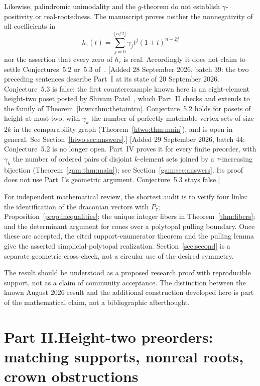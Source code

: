 \documentclass[11pt]{article}
\numberwithin{equation}{section}
\theoremstyle{definition}
\begin{document}
Likewise, palindromic unimodality and the $g$-theorem do not establish
$\gamma$-positivity or real-rootedness. The manuscript proves neither the
nonnegativity of all coefficients in
\[
 h_\tau(t)=\sum_{j=0}^{\lfloor n/2\rfloor}
       \gamma_jt^j(1+t)^{n-2j}
\]
nor the assertion that every zero of $h_\tau$ is real. Accordingly it does
not claim to settle Conjectures~5.2 or~5.3 of~\cite{AC}.
[Added 28 September 2026, batch 39: the two preceding sentences describe
Part~I at its state of 20 September 2026. Conjecture~5.3 is false: the first
counterexample known here is an eight-element height-two poset posted by
Shivam Patel~\cite{Patel}, which Part~II checks and extends to the family of
Theorem~\ref{htwo:thm:thetaintro}. Conjecture~5.2 holds for posets of height at
most two, with $\gamma_k$ the number of perfectly matchable vertex sets of
size $2k$ in the comparability graph (Theorem~\ref{htwo:thm:main}), and is
open in general. See Section~\ref{htwo:sec:answers}.]
[Added 29 September 2026, batch 44: Conjecture~5.2 is no longer open. Part~IV
proves it for every finite preorder, with $\gamma_k$ the number of ordered
pairs of disjoint $k$-element sets joined by a $\tau$-increasing bijection
(Theorem~\ref{gam:thm:main}); see Section~\ref{gam:sec:answers}. Its proof
does not use Part~I's geometric argument. Conjecture~5.3 stays false.]

For independent mathematical review, the shortest audit is to verify four
links: the identification of the draconian vectors with $P_\tau$;
Proposition~\ref{prop:inequalities}; the unique integer fibers in
Theorem~\ref{thm:fibers}; and the determinant argument for cones over a
polytopal pulling boundary. Once these are accepted, the cited
support-enumerator theorem and the pulling lemma give the asserted
simplicial-polytopal realization. Section~\ref{sec:second} is a separate
geometric cross-check, not a circular use of the desired symmetry.

The result should be understood as a proposed research proof with reproducible
support, not as a claim of community acceptance. The distinction between the
known August 2026 result and the additional construction developed here is
part of the mathematical claim, not a bibliographic afterthought.

\clearpage
{}\part*{Part II.\quad Height-two preorders: matching supports, nonreal roots, crown obstructions}
\end{document}
